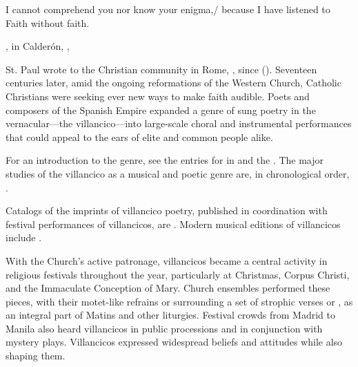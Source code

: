 


\label{ch:faith-hearing}

\epigraph
{I cannot comprehend you nor know your enigma,/ because I have listened to Faith without faith.}
{, in Calderón, , \textlinenums{13\XXX--\XXX}}

St. Paul wrote to the Christian community in Rome, , since  ().
Seventeen centuries later, amid the ongoing reformations of the Western Church, Catholic Christians were seeking ever new ways to make faith audible.
Poets and composers of the Spanish Empire expanded a genre of sung poetry in the vernacular---the villancico---into large-scale choral and instrumental performances that could appeal to the ears of elite and common people alike.%
\begin{Footnote}
  For an introduction to the genre, see the entries for  in  and the .
  The major studies of the villancico as a musical and poetic genre are, in chronological order, \autocites{Rubio:Forma}{Laird:VC}{Torrente:PhD}{Tenorio:SorJuana}
  {CaberoPueyo:PhD}{Illari:Polychoral}{Knighton-Torrente:VCs}
  {Cashner:Cards}{Cashner:PhD}.

  Catalogs of the imprints of villancico poetry, published in coordination with festival performances of villancicos, are \autocites{BNE:VCs17C}{BNE:VCs18C}{UK:VCs}{US:VCs}. \XXX[Montserrat]
  Modern musical editions of villancicos include \autocites{Cererols:MEM-VC}
  {Stevenson:Christmas}{Ruimonte:Parnaso}{Padilla:Tello}{Ezquerro:MME55}
  {RuizSamaniego:MME63}{Ezquerro:MME59}{Ezquerro:MME65}{Fernandez:Cancionero}
  {Torrejon:VCs}{Cashner:SingingAboutSingingI}.
\end{Footnote}


With the Church's active patronage, villancicos became a central activity in religious festivals throughout the year, particularly at Christmas, Corpus Christi, and the Immaculate Conception of Mary.
Church ensembles performed these pieces, with their motet-like refrains or  surrounding a set of strophic verses or , as an integral part of Matins and other liturgies.
Festival crowds from Madrid to Manila also heard villancicos in public processions and in conjunction with mystery plays.
Villancicos expressed widespread beliefs and attitudes while also shaping them.

